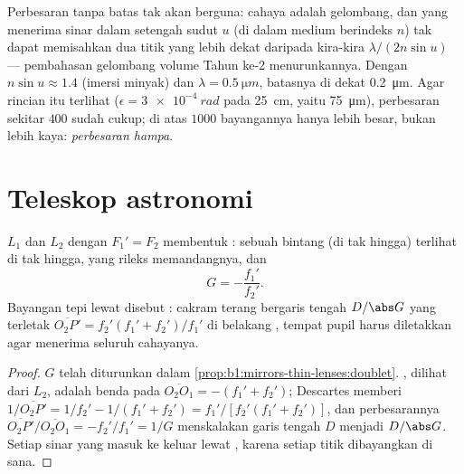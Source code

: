 \begin{remark}\label{rem:b1:optical-instruments:abbe}
Perbesaran tanpa batas tak akan berguna: cahaya adalah gelombang, dan
 yang menerima sinar dalam setengah sudut $u$ (di dalam medium
berindeks $n$) tak dapat memisahkan dua titik yang lebih dekat daripada
kira-kira $\lambda/(2n\sin u)$ --- pembahasan gelombang volume Tahun
ke-2 menurunkannya. Dengan $n\sin u \approx 1.4$ (imersi minyak) dan $\lambda =
\qty{0.5}{\micro m}$, batasnya di dekat \qty{0.2}{\micro m}. Agar
rincian itu terlihat  ($\epsilon = \qty{3e-4}{rad}$ pada
\qty{25}{cm}, yaitu \qty{75}{\micro m}), perbesaran sekitar $400$ sudah
cukup; di atas $1000$ bayangannya hanya lebih besar, bukan lebih kaya:
\emph{perbesaran hampa}.
\end{remark}

\section{Teleskop astronomi}

\begin{proposition}\label{prop:b1:optical-instruments:telescope}
 $L_1$ dan  $L_2$ dengan $F_1' = F_2$
membentuk : sebuah bintang (di tak hingga) terlihat di tak
hingga,  yang rileks memandangnya, dan
\[
G = -\frac{f_1'}{f_2'} .
\]
Bayangan tepi  lewat  disebut \emph{}:
cakram terang bergaris tengah $D/\abs G$ yang terletak
$\overline{O_2P'} = f_2'(f_1' + f_2')/f_1'$ di belakang ,
tempat pupil  harus diletakkan agar menerima seluruh cahayanya.
\end{proposition}

\begin{proof}
$G$ telah diturunkan dalam \cref{prop:b1:mirrors-thin-lenses:doublet}.
, dilihat dari $L_2$, adalah benda pada $\overline{O_2O_1} = -(f_1'
+ f_2')$; Descartes memberi $1/\overline{O_2P'} = 1/f_2' - 1/(f_1' + f_2')
= f_1'/[f_2'(f_1' + f_2')]$, dan perbesarannya $\overline{O_2P'}/
\overline{O_2O_1} = -f_2'/f_1' = 1/G$ menskalakan garis tengah $D$
menjadi $D/\abs G$. Setiap sinar yang masuk ke  keluar lewat
, karena setiap titik  dibayangkan di sana.
\end{proof}

